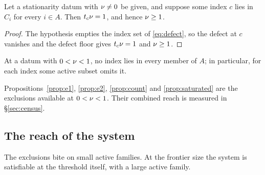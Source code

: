 \begin{proposition}[Lean]\label{prop:saturated}
Let a stationarity datum with $\nu\ne0$ be given, and suppose some index
$c$ lies in $C_i$ for every $i\in A$.  Then $t_c\nu=1$, and hence
$\nu\ge1$.
\end{proposition}

\begin{proof}
The hypothesis empties the index set of \eqref{eq:defect}, so the defect
at $c$ vanishes and the defect floor gives $t_c\nu=1$ and $\nu\ge1$.
\end{proof}

\begin{corollary}\label{cor:saturated}
At a datum with $0<\nu<1$, no index lies in every member of $A$; in
particular, for each index some active subset omits it.
\end{corollary}

Propositions~\ref{prop:e1}, \ref{prop:e2}, \ref{prop:count} and
\ref{prop:saturated} are the exclusions available at $0<\nu<1$.  Their
combined reach is measured in \S\ref{sec:census}.

\subsection{The reach of the system}\label{sec:reach}

The exclusions bite on small active families.  At the frontier size the
system is satisfiable at the threshold itself, with a large active
family.

